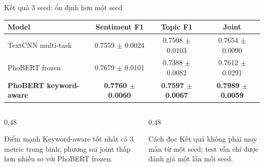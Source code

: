 \documentclass[aspectratio=169,11pt]{beamer}
\newcommand{\good}[1]{\textcolor{sgublue}{\textbf{#1}}}
\begin{document}
\begin{frame}{Kết quả 3 seed: ổn định hơn một seed}
\small
\begin{center}
\begin{tabular}{@{}lccc@{}}
\toprule
Model & Sentiment F1 & Topic F1 & Joint \\
\midrule
TextCNN multi-task & 0.7559 $\pm$ 0.0024 & 0.7508 $\pm$ 0.0103 & 0.7654 $\pm$ 0.0090 \\
PhoBERT frozen & 0.7679 $\pm$ 0.0101 & 0.7388 $\pm$ 0.0082 & 0.7612 $\pm$ 0.0291 \\
\good{PhoBERT keyword-aware} & \good{0.7760 $\pm$ 0.0060} & \good{0.7597 $\pm$ 0.0067} & \good{0.7989 $\pm$ 0.0059} \\
\bottomrule
\end{tabular}
\end{center}

\vspace{0.3cm}
\begin{columns}[T]
\begin{column}{0.48\textwidth}
\begin{block}{Điểm mạnh}
Keyword-aware tốt nhất cả 3 metric trung bình; phương sai joint thấp hơn nhiều so với PhoBERT frozen.
\end{block}
\end{column}
\begin{column}{0.48\textwidth}
\begin{block}{Cách đọc}
Kết quả không phải may mắn từ một seed; test vẫn chỉ được đánh giá một lần mỗi seed.
\end{block}
\end{column}
\end{columns}
\end{frame}
\end{document}
